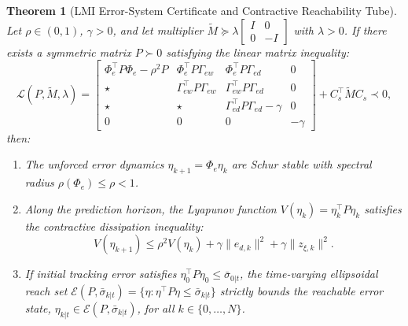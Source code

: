 \documentclass[journal]{IEEEtran}
\newtheorem{theorem}{Theorem}
\begin{document}
\begin{theorem}[LMI Error-System Certificate and Contractive Reachability Tube]
Let $\rho \in (0, 1)$, $\gamma > 0$, and let multiplier $\widetilde{M} \succeq \lambda \begin{bmatrix} I & 0 \\ 0 & -I \end{bmatrix}$ with $\lambda > 0$. If there exists a symmetric matrix $P \succ 0$ satisfying the linear matrix inequality:
\begin{equation}
\mathcal{L}(P, \widetilde{M}, \lambda) = \begin{bmatrix}
\Phi_e^\top P \Phi_e - \rho^2 P & \Phi_e^\top P \Gamma_{ew} & \Phi_e^\top P \Gamma_{ed} & 0 \\
\star & \Gamma_{ew}^\top P \Gamma_{ew} & \Gamma_{ew}^\top P \Gamma_{ed} & 0 \\
\star & \star & \Gamma_{ed}^\top P \Gamma_{ed} - \gamma & 0 \\
0 & 0 & 0 & -\gamma
\end{bmatrix} + C_s^\top \widetilde{M} C_s \prec 0,
\label{eq:lmi}
\end{equation}
then:
\begin{enumerate}
    \item The unforced error dynamics $\eta_{k+1} = \Phi_e \eta_k$ are Schur stable with spectral radius $\rho(\Phi_e) \le \rho < 1$.
    \item Along the prediction horizon, the Lyapunov function $V(\eta_k) = \eta_k^\top P \eta_k$ satisfies the contractive dissipation inequality:
    \begin{equation}
    V(\eta_{k+1}) \le \rho^2 V(\eta_k) + \gamma \|e_{d,k}\|^2 + \gamma \|z_{\xi,k}\|^2.
    \end{equation}
    \item If initial tracking error satisfies $\eta_0^\top P \eta_0 \le \bar\sigma_{0|t}$, the time-varying ellipsoidal reach set $\mathcal{E}(P, \bar\sigma_{k|t}) = \{\eta : \eta^\top P \eta \le \bar\sigma_{k|t}\}$ strictly bounds the reachable error state, $\eta_{k|t} \in \mathcal{E}(P, \bar\sigma_{k|t})$, for all $k \in \{0, \ldots, N\}$.
\end{enumerate}
\end{theorem}
\end{document}
